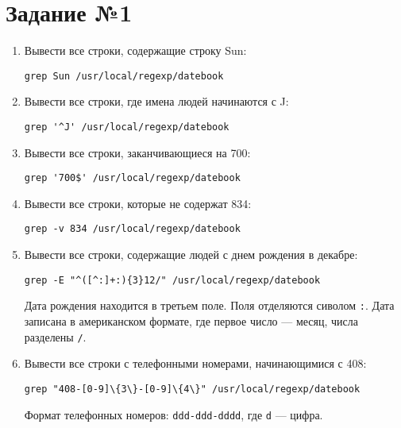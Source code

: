 \documentclass[listings]{labreport}
\begin{document}
\maketitlepage

\section*{Задание №1}

\begin{enumerate}
\item Вывести все строки, содержащие строку Sun:
\begin{verbatim}
grep Sun /usr/local/regexp/datebook
\end{verbatim}

\item Вывести все строки, где имена людей начинаются с J:
\begin{verbatim}
grep '^J' /usr/local/regexp/datebook
\end{verbatim}

\item Вывести все строки, заканчивающиеся на 700:
\begin{verbatim}
grep '700$' /usr/local/regexp/datebook
\end{verbatim}

\item Вывести все строки, которые не содержат 834:
\begin{verbatim}
grep -v 834 /usr/local/regexp/datebook
\end{verbatim}

\item Вывести все строки, содержащие людей с днем рождения в декабре:
\begin{verbatim}
grep -E "^([^:]+:){3}12/" /usr/local/regexp/datebook
\end{verbatim}

\begin{small}
  Дата рождения находится в третьем поле. Поля отделяются сиволом \texttt{:}.
  Дата записана в американском формате, где первое число — месяц, числа разделены \texttt{/}.
\end{small}

\item Вывести все строки с телефонными номерами, начинающимися с 408:
\begin{verbatim}
grep "408-[0-9]\{3\}-[0-9]\{4\}" /usr/local/regexp/datebook
\end{verbatim}

\begin{small}
  Формат телефонных номеров: \texttt{ddd-ddd-dddd}, где \texttt{d} — цифра.
\end{small}


\end{enumerate}
\end{document}
